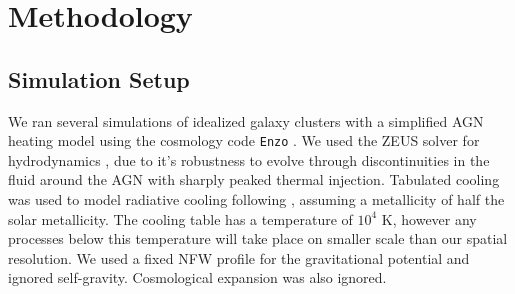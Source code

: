 \documentclass[iop,apjl, twocolappendix]{emulateapj}   %
\begin{document}

\section{Methodology}
\label{sec:methodology}

\subsection{Simulation Setup}
\label{sec:simulation_setup}

We ran several simulations of idealized galaxy clusters with a simplified AGN
heating model using the cosmology code \texttt{Enzo} \cite{bryan_enzo_2014-1}.
We used the ZEUS solver for hydrodynamics \cite{stone_zeus-2d_1992}, due to
it's robustness to evolve through discontinuities in the fluid around the AGN
with sharply peaked thermal injection. Tabulated cooling was used to model
radiative cooling following \citep{schure_new_2009-2}, assuming a metallicity
of half the solar metallicity. The cooling table has a temperature of $10^4
\text{ K}$, however any processes below this temperature will take place on
smaller scale than our spatial resolution. We used a fixed NFW profile for the
gravitational potential and ignored self-gravity.  Cosmological expansion was
also ignored.
\end{document}

